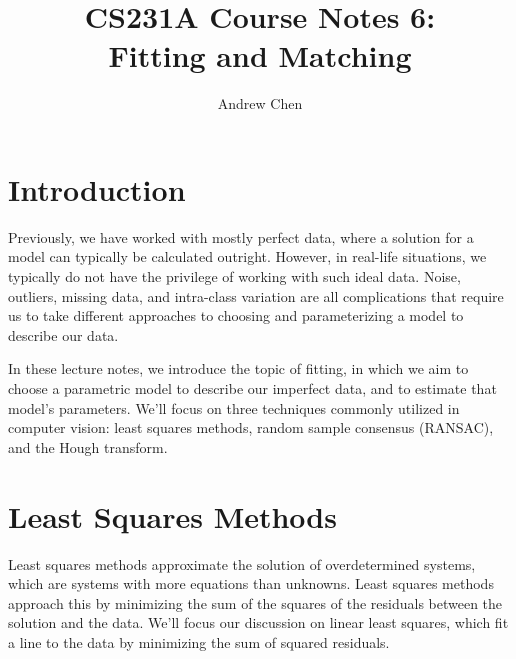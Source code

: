 \documentclass[a4paper, 12pt]{article}
\title{CS231A Course Notes 6: \\Fitting and Matching}
\author{Andrew Chen}
\date{}
\begin{document}
\maketitle

\section{Introduction}
Previously, we have worked with mostly perfect data, where a solution for a model can typically be calculated outright.  However, in real-life situations, we typically do not have the privilege of working with such ideal data.  Noise, outliers, missing data, and intra-class variation are all complications that require us to take different approaches to choosing and parameterizing a model to describe our data.

In these lecture notes, we introduce the topic of fitting, in which we aim to choose a parametric model to describe our imperfect data, and to estimate that model's parameters.  We'll focus on three techniques commonly utilized in computer vision: least squares methods, random sample consensus (RANSAC), and the Hough transform.

\section{Least Squares Methods}

Least squares methods approximate the solution of overdetermined systems, which are systems with more equations than unknowns.  Least squares methods approach this by minimizing the sum of the squares of the residuals between the solution and the data.  We'll focus our discussion on linear least squares, which fit a line to the data by minimizing the sum of squared residuals.
\end{document}
